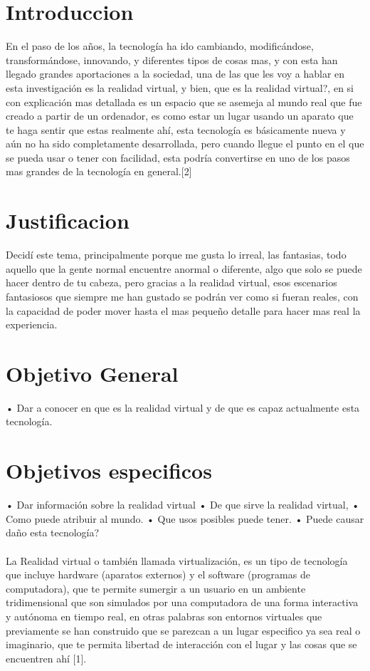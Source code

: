 \documentclass{bmcart}
\begin{document}

\section*{Introduccion}
En el paso de los años, la tecnología ha ido cambiando, modificándose, transformándose, innovando, y diferentes tipos de cosas mas, y con esta han llegado grandes aportaciones a la sociedad, una de las que les voy a hablar en esta investigación es la realidad virtual, y bien, que es la realidad virtual?, en si con explicación mas detallada es un espacio que se asemeja al mundo real que fue creado a partir de un ordenador, es como estar un lugar usando un aparato que te haga sentir que estas realmente ahí, esta tecnología es básicamente nueva y aún no ha sido completamente desarrollada, pero cuando llegue el punto en el que se pueda usar o tener con facilidad, esta podría convertirse en uno de los pasos mas grandes de la tecnología en general.[2] %

\section*{Justificacion}
Decidí este tema, principalmente porque me gusta lo irreal, las fantasias, todo aquello que la gente normal encuentre anormal o diferente, algo que solo se puede hacer dentro de tu cabeza, pero gracias a la realidad virtual, esos escenarios fantasiosos que siempre me han gustado se podrán ver como si fueran reales, con la capacidad de poder mover hasta el mas pequeño detalle para hacer mas real la experiencia. 
\section*{Objetivo General}
•	Dar a conocer en que es la realidad virtual y de que es capaz actualmente esta tecnología.
\section{Objetivos especificos}
•	Dar información sobre la realidad virtual
•	De que sirve la realidad virtual,
•	Como puede atribuir al mundo.
•	Que usos posibles puede tener.
•	Puede causar daño esta tecnología?

\paragraph*{}
La Realidad virtual o también llamada virtualización, es un tipo de tecnología que incluye hardware (aparatos externos) y el software (programas de computadora), que te permite sumergir a un usuario en un ambiente tridimensional que son simulados por una computadora de una forma interactiva y autónoma en tiempo real, en otras palabras son entornos virtuales que previamente se han construido que se parezcan a un lugar especifico ya sea real o imaginario, que te permita libertad de interacción con el lugar y las cosas que se encuentren ahí [1].
\end{document}
